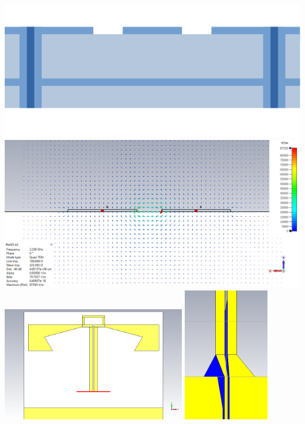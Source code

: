 \documentclass[aspectratio=43]{beamer}
\begin{document}
\begin{frame}
\begin{columns}
				\includegraphics[width=\textwidth]{cpw.pdf}
				\centering
				\includegraphics[width=\textwidth]{e1_2.png}\\[3ex]
				\includegraphics[width=0.6\textwidth]{bifa_broadband_3D.png}
				\includegraphics[width=0.28\textwidth]{balun_3.png}\\[3ex]

\end{columns}
\end{frame}
\end{document}
